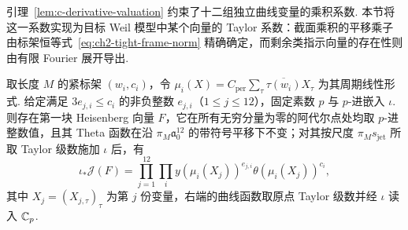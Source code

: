 引理~\ref{lem:c-derivative-valuation} 约束了十二组独立曲线变量的乘积系数. 本节将这一系数实现为目标 Weil 模型中某个向量的 Taylor 系数：截面乘积的平移乘子由标架恒等式~\eqref{eq:ch2-tight-frame-norm} 精确确定，而剩余类指示向量的存在性则由有限 Fourier 展开导出.

\begin{lemma}
\label{lem:c-derivative-twelve-realization}
\emitthmsource
取长度 $M$ 的紧标架 $(w_i,c_i)$，令 $\mu_i(X)=C_{\mathrm{per}}\sum_\tau\overline{\tau(w_i)}X_\tau$ 为其周期线性形式. 给定满足 $3e_{j,i}\le c_i$ 的非负整数 $e_{j,i}$（$1\le j\le12$），固定素数 $p$ 与 $p$-进嵌入 $\iota$. 则存在第一块 Heisenberg 向量 $F$，它在所有无穷分量为零的阿代尔点处均取 $p$-进整数值，且其 Theta 函数在沿 $\pi_M\mathfrak a_0^{12}$ 的带符号平移下不变；对其按尺度 $\pi_M s_{\mathrm{jet}}$ 所取 Taylor 级数施加 $\iota$ 后，有
\[
 \iota_*\mathcal J(F)=
 \prod_{j=1}^{12}\prod_i
       y(\mu_i(X_j))^{e_{j,i}}\theta(\mu_i(X_j))^{c_i},
\]
其中 $X_j=(X_{j,\tau})_\tau$ 为第 $j$ 份变量，右端的曲线函数取原点 Taylor 级数并经 $\iota$ 读入 $\mathbb{C}_p$.
\end{lemma}

